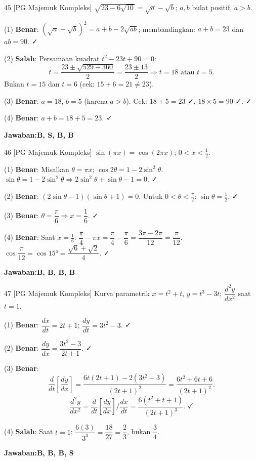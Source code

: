 \documentclass[11pt]{article}
\newcommand{\jawaban}[1]{\textbf{Jawaban:}\enspace\colorbox{gold!30}{\textbf{#1}}}
\begin{document}
\begin{soal}{45 \normalfont\small[PG Majemuk Kompleks]}
$\sqrt{23-6\sqrt{10}}=\sqrt{a}-\sqrt{b}$; $a,b$ bulat positif, $a>b$.
\end{soal}
\begin{pembox}
(1) \textbf{Benar}: $(\sqrt{a}-\sqrt{b})^2=a+b-2\sqrt{ab}$; membandingkan: $a+b=23$ dan $ab=90$. ✓

(2) \textbf{Salah}: Persamaan kuadrat $t^2-23t+90=0$:
\[
t=\frac{23\pm\sqrt{529-360}}{2}=\frac{23\pm13}{2}\Rightarrow t=18\text{ atau }t=5.
\]
Bukan $t=15$ dan $t=6$ (cek: $15+6=21\neq23$).

(3) \textbf{Benar}: $a=18$, $b=5$ (karena $a>b$). Cek: $18+5=23$ ✓, $18\times5=90$ ✓. ✓

(4) \textbf{Benar}: $a+b=18+5=23$. ✓

\jawaban{B, S, B, B}
\end{pembox}

\begin{soal}{46 \normalfont\small[PG Majemuk Kompleks]}
$\sin(\pi x)=\cos(2\pi x)$; $0<x<\tfrac{1}{2}$.
\end{soal}
\begin{pembox}
(1) \textbf{Benar}: Misalkan $\theta=\pi x$; $\cos2\theta=1-2\sin^2\theta$.
$\sin\theta=1-2\sin^2\theta\Rightarrow2\sin^2\theta+\sin\theta-1=0$. ✓

(2) \textbf{Benar}: $(2\sin\theta-1)(\sin\theta+1)=0$. Untuk $0<\theta<\tfrac\pi2$: $\sin\theta=\tfrac12$. ✓

(3) \textbf{Benar}: $\theta=\dfrac\pi6\Rightarrow x=\dfrac16$. ✓

(4) \textbf{Benar}: Saat $x=\tfrac16$: $\dfrac\pi4-\pi x=\dfrac\pi4-\dfrac\pi6=\dfrac{3\pi-2\pi}{12}=\dfrac\pi{12}$.
$\cos\dfrac\pi{12}=\cos15°=\dfrac{\sqrt6+\sqrt2}{4}$. ✓

\jawaban{B, B, B, B}
\end{pembox}

\begin{soal}{47 \normalfont\small[PG Majemuk Kompleks]}
Kurva parametrik $x=t^2+t$, $y=t^3-3t$; $\dfrac{d^2y}{dx^2}$ saat $t=1$.
\end{soal}
\begin{pembox}
(1) \textbf{Benar}: $\dfrac{dx}{dt}=2t+1$; $\dfrac{dy}{dt}=3t^2-3$. ✓

(2) \textbf{Benar}: $\dfrac{dy}{dx}=\dfrac{3t^2-3}{2t+1}$. ✓

(3) \textbf{Benar}:
\[
\frac{d}{dt}\!\left[\frac{dy}{dx}\right]=\frac{6t(2t+1)-2(3t^2-3)}{(2t+1)^2}=\frac{6t^2+6t+6}{(2t+1)^2}.
\]
\[
\frac{d^2y}{dx^2}=\frac{d}{dt}\!\left[\frac{dy}{dx}\right]\bigg/\frac{dx}{dt}=\frac{6(t^2+t+1)}{(2t+1)^3}.\;\checkmark
\]

(4) \textbf{Salah}: Saat $t=1$: $\dfrac{6(3)}{3^3}=\dfrac{18}{27}=\dfrac23$, bukan $\dfrac34$.

\jawaban{B, B, B, S}
\end{pembox}
\end{document}
